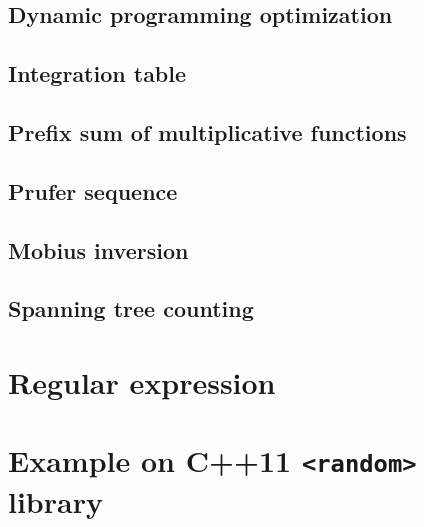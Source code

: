 \documentclass[UTF8,a4paper]{report}
\begin{document}
			\subsection{Dynamic programming optimization}
				
			\subsection{Integration table}
				
			\subsection{Prefix sum of multiplicative functions}
				
			\subsection{Prufer sequence}
				
			\subsection{Mobius inversion}
				
			\subsection{Spanning tree counting}
				
		\section{Regular expression}
				
			
		\section{Example on C++11 \texttt{<random>} library}
			
\end{document}
